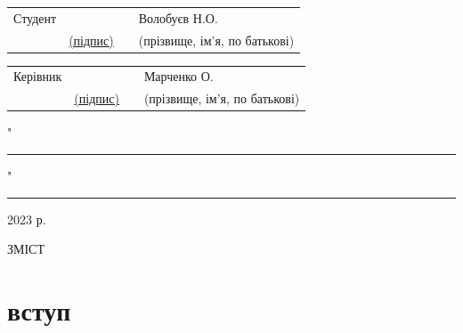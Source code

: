 \documentclass[14pt]{article}
\begin{document}
\begin{flushleft}
\vspace{1cm}
\begin{tabularx}{1.15\textwidth}{p{4.5cm} p{2cm} Y Y}
\centering Студент &&& Волобуєв Н.О.\\
& \fontsize{8}{11}\selectfont \centering \underline{(підпис)} && \fontsize{8}{11}\selectfont \centering (прізвище, ім’я, по батькові)\\
\end{tabularx}

\vspace{1cm}
\begin{tabularx}{1.15\textwidth}{p{4.5cm} p{2cm} Y Y}
\centering Керівник &&& Марченко О.\\
& \fontsize{8}{11}\selectfont \centering \underline{(підпис)} && \fontsize{8}{11}\selectfont \centering (прізвище, ім’я, по батькові)\\
\end{tabularx}
\end{flushleft}

"\rule{1cm}{0.15mm}" \rule{4cm}{0.15mm} 2023 р.

\pagebreak

\fontsize{14}{17}\selectfont
\begin{center}
ЗМІСТ
\end{center}

\renewcommand\contentsname{}
\tableofcontents

\thispagestyle{empty}

\pagebreak

\chapter{вступ}
\end{document}
